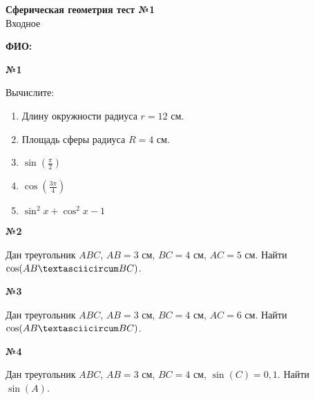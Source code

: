


    \begin{center}
        \textbf{Сферическая геометрия тест №1}\\
        Входное
    \end{center}

    \textbf{ФИО:}

    \begin{center}
        \textbf{№1}
    \end{center}

    Вычислите:
    \begin{enumerate}
        \item Длину окружности радиуса $r = 12$ см.
        \item Площадь сферы радиуса $R = 4$ см.
        \item $\sin\left(\frac{\pi}{2}\right)$
        \item $\cos\left(\frac{3\pi}{4}\right)$
        \item $\sin ^ 2 x + \cos ^ 2 x - 1$
    \end{enumerate}

    \begin{center}
        \textbf{№2}
    \end{center}

    Дан треугольник $ABC$, $AB = 3$ см, $BC = 4$ см, $AC = 5$ см.
    Найти $\cos(AB \textasciicircum BC)$.

    \begin{center}
        \textbf{№3}
    \end{center}

    Дан треугольник $ABC$, $AB = 3$ см, $BC = 4$ см, $AC = 6$ см.
    Найти $\cos(AB \textasciicircum BC)$.

    \begin{center}
        \textbf{№4}
    \end{center}

    Дан треугольник $ABC$, $AB = 3$ см, $BC = 4$ см, $\sin(C) = 0,1$.
    Найти $\sin(A)$.



